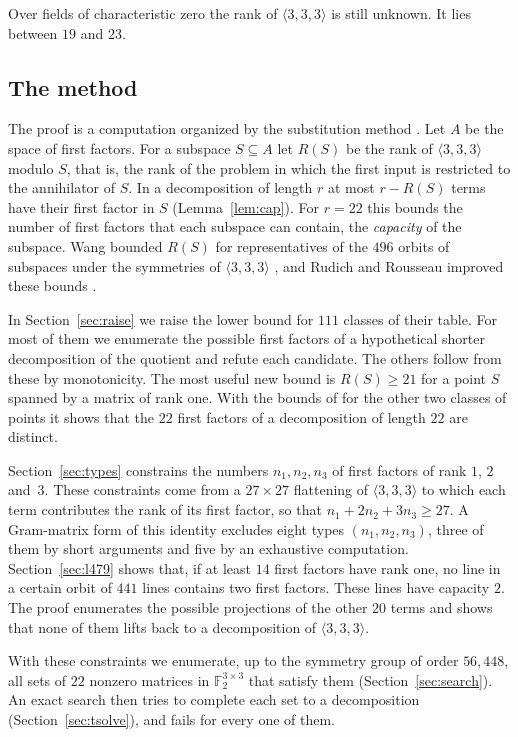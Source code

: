 \documentclass[11pt]{amsart}
\theoremstyle{definition}
\theoremstyle{remark}
\numberwithin{equation}{section}
\newcommand{\F}{\mathbb{F}_2}
\newcommand{\mm}{\langle 3,3,3\rangle}
\begin{document}
Over fields of characteristic zero the rank of $\mm$ is still unknown. It lies between $19$ and $23$.

\subsection*{The method}
The proof is a computation organized by the substitution method \cite{Pan66,AFT11,LM17,Bla03,Bla13}. Let $A$ be the space of first factors. For a subspace $S\subseteq A$ let $R(S)$ be the rank of $\mm$ modulo $S$, that is, the rank of the problem in which the first input is restricted to the annihilator of $S$. In a decomposition of length $r$ at most $r-R(S)$ terms have their first factor in $S$ (Lemma~\ref{lem:cap}). For $r=22$ this bounds the number of first factors that each subspace can contain, the \emph{capacity} of the subspace. Wang bounded $R(S)$ for representatives of the $496$ orbits of subspaces under the symmetries of $\mm$ \cite{Wan26a}, and Rudich and Rousseau improved these bounds \cite{RR26}.

In Section~\ref{sec:raise} we raise the lower bound for $111$ classes of their table. For most of them we enumerate the possible first factors of a hypothetical shorter decomposition of the quotient and refute each candidate. The others follow from these by monotonicity. The most useful new bound is $R(S)\ge 21$ for a point $S$ spanned by a matrix of rank one. With the bounds of \cite{RR26} for the other two classes of points it shows that the $22$ first factors of a decomposition of length $22$ are distinct.

Section~\ref{sec:types} constrains the numbers $n_1,n_2,n_3$ of first factors of rank $1$, $2$ and~$3$. These constraints come from a $27\times 27$ flattening of $\mm$ to which each term contributes the rank of its first factor, so that $n_1+2n_2+3n_3\ge 27$. A Gram-matrix form of this identity excludes eight types $(n_1,n_2,n_3)$, three of them by short arguments and five by an exhaustive computation. Section~\ref{sec:l479} shows that, if at least $14$ first factors have rank one, no line in a certain orbit of $441$ lines contains two first factors. These lines have capacity $2$. The proof enumerates the possible projections of the other $20$ terms and shows that none of them lifts back to a decomposition of $\mm$.

With these constraints we enumerate, up to the symmetry group of order $56{,}448$, all sets of $22$ nonzero matrices in $\F^{3\times 3}$ that satisfy them (Section~\ref{sec:search}). An exact search then tries to complete each set to a decomposition (Section~\ref{sec:tsolve}), and fails for every one of them.
\end{document}
